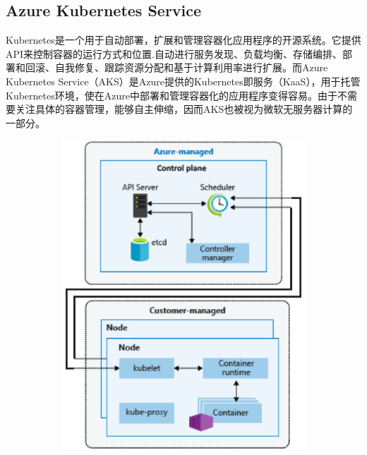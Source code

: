 \subsection{Azure Kubernetes Service}
Kubernetes是一个用于自动部署，扩展和管理容器化应用程序的开源系统。它提供API来控制容器的运行方式和位置.自动进行服务发现、负载均衡、存储编排、部署和回滚、自我修复、跟踪资源分配和基于计算利用率进行扩展。而Azure Kubernetes Service（AKS）是Azure提供的Kubernetes即服务（KaaS），用于托管Kubernetes环境，使在Azure中部署和管理容器化的应用程序变得容易。由于不需要关注具体的容器管理，能够自主伸缩，因而AKS也被视为微软无服务器计算的一部分。
\begin{figure}[!htbp]
	\begin{subfigure}[b]{0.38\linewidth}
		\includegraphics[width=\linewidth]{figs/Kubernetes}
		\caption{}
		\label{figs:Structure}
	\end{subfigure}
	\begin{subfigure}[b]{0.62\linewidth}

\end{subfigure}
\end{figure}
